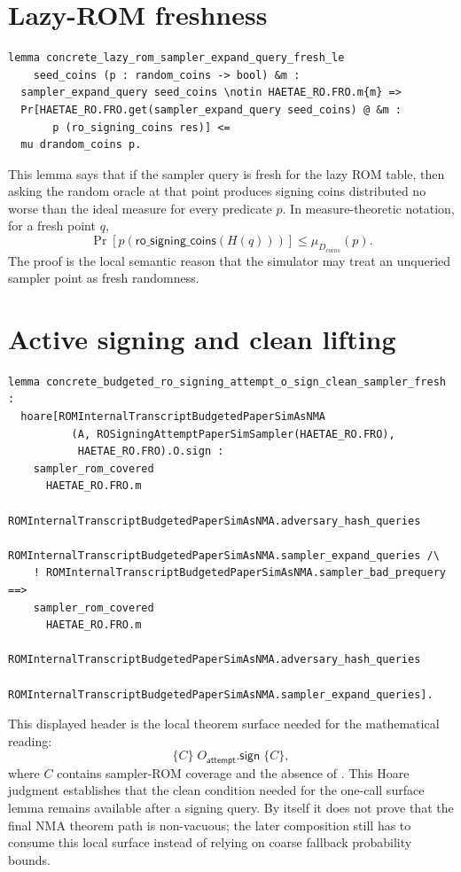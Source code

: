 \section{Lazy-ROM freshness}
\label{app:case-lazy-rom-freshness}

\begin{lstlisting}[language=EasyCrypt,caption={Concrete freshness lemma for a sampler ROM point.},label={lst:case-fresh-le}]
lemma concrete_lazy_rom_sampler_expand_query_fresh_le
    seed_coins (p : random_coins -> bool) &m :
  sampler_expand_query seed_coins \notin HAETAE_RO.FRO.m{m} =>
  Pr[HAETAE_RO.FRO.get(sampler_expand_query seed_coins) @ &m :
       p (ro_signing_coins res)] <=
  mu drandom_coins p.
\end{lstlisting}

This lemma says that if the sampler query is fresh for the lazy ROM table, then
asking the random oracle at that point produces signing coins distributed no
worse than the ideal  measure for every predicate \(p\).  In
measure-theoretic notation, for a fresh point \(q\),
\[
  \Pr[p(\mathsf{ro\_signing\_coins}(H(q)))]
  \le
  \mu_{D_{coins}}(p).
\]
The proof is the local semantic reason that the simulator may treat an
unqueried sampler point as fresh randomness.

\section{Active signing and clean lifting}
\label{app:case-active-signing-clean-lifting}

\begin{lstlisting}[language=EasyCrypt,caption={Clean sampler-ROM preservation across one active signing call.},label={lst:case-o-sign-clean}]
lemma concrete_budgeted_ro_signing_attempt_o_sign_clean_sampler_fresh :
  hoare[ROMInternalTranscriptBudgetedPaperSimAsNMA
          (A, ROSigningAttemptPaperSimSampler(HAETAE_RO.FRO),
           HAETAE_RO.FRO).O.sign :
    sampler_rom_covered
      HAETAE_RO.FRO.m
      ROMInternalTranscriptBudgetedPaperSimAsNMA.adversary_hash_queries
      ROMInternalTranscriptBudgetedPaperSimAsNMA.sampler_expand_queries /\
    ! ROMInternalTranscriptBudgetedPaperSimAsNMA.sampler_bad_prequery ==>
    sampler_rom_covered
      HAETAE_RO.FRO.m
      ROMInternalTranscriptBudgetedPaperSimAsNMA.adversary_hash_queries
      ROMInternalTranscriptBudgetedPaperSimAsNMA.sampler_expand_queries].
\end{lstlisting}

This displayed header is the local theorem surface needed for the mathematical
reading:
\[
  \{C\}\;O_{\mathsf{attempt}}.\mathsf{sign}\;\{C\},
\]
where \(C\) contains sampler-ROM coverage and the absence of
.  This Hoare judgment establishes that the clean
condition needed for the one-call surface lemma remains available after a
signing query.  By itself it does not prove that the final NMA theorem path is
non-vacuous; the later composition still has to consume this local surface
instead of relying on coarse fallback probability bounds.

